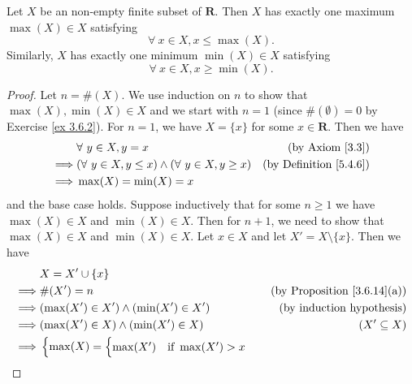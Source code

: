 \begin{additional corollary}\label{ac 5.4.1}
Let \(X\) be an non-empty finite subset of \(\mathbf{R}\).
Then \(X\) has exactly one maximum \(\max(X) \in X\) satisfying
\[
    \forall\ x \in X, x \leq \max(X).
\]
Similarly, \(X\) has exactly one minimum \(\min(X) \in X\) satisfying
\[
    \forall\ x \in X, x \geq \min(X).
\]
\end{additional corollary}

\begin{proof}
    Let \(n = \#(X)\).
    We use induction on \(n\) to show that \(\max(X), \min(X) \in X\) and we start with \(n = 1\) (since \(\#(\emptyset) = 0\) by Exercise \ref{ex 3.6.2}).
    For \(n = 1\), we have \(X = \{x\}\) for some \(x \in \mathbf{R}\).
    Then we have
    \begin{align*}
                 & \forall\ y \in X, y = x                                         & \text{(by Axiom \ref{3.3})}        \\
        \implies & (\forall\ y \in X, y \leq x) \land (\forall\ y \in X, y \geq x) & \text{(by Definition \ref{5.4.6})} \\
        \implies & \max(X) = \min(X) = x
    \end{align*}
    and the base case holds.
    Suppose inductively that for some \(n \geq 1\) we have \(\max(X) \in X\) and \(\min(X) \in X\).
    Then for \(n + 1\), we need to show that \(\max(X) \in X\) and \(\min(X) \in X\).
    Let \(x \in X\) and let \(X' = X \setminus \{x\}\).
    Then we have
    \begin{align*}
                 & X = X' \cup \{x\}                                                                                                                     \\
        \implies & \#(X') = n                                                                                  & \text{(by Proposition \ref{3.6.14}(a))} \\
        \implies & (\max(X') \in X') \land (\min(X') \in X')                                                   & \text{(by induction hypothesis)}        \\
        \implies & (\max(X') \in X) \land (\min(X') \in X)                                                     & (X' \subseteq X)                        \\
        \implies & \begin{cases}
            \max(X) = \begin{cases}
                \max(X') & \text{if } \max(X') > x \\

\end{cases}
\end{cases}
\end{align*}
\end{proof}
